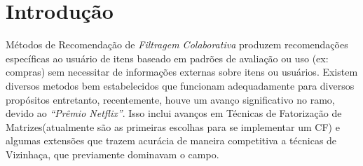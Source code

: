\section{Introdução}

\par
Métodos de Recomendação de \textit{Filtragem Colaborativa} produzem recomendações específicas ao usuário de itens baseado em padrões de avaliação ou uso (ex: compras) sem necessitar de informações externas sobre itens ou usuários. Existem diversos metodos bem estabelecidos que funcionam adequadamente para diversos propósitos entretanto, recentemente, houve um avanço significativo no ramo, devido ao \textit{``Prêmio Netflix''}. Isso inclui avanços em Técnicas de Fatorização de Matrizes(atualmente são as primeiras escolhas para se implementar um CF) e algumas extensões que trazem acurácia de maneira competitiva a técnicas de Vizinhaça, que previamente dominavam o campo.
